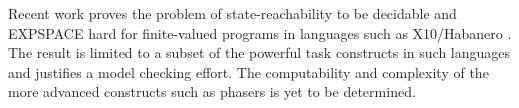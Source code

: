 \begin{comment}
Such a
dependence can be avoided, as in this work, by creating a
non-performance oriented runtime that is simple enough to manually
verify for correctness \cite{Morse:2012:MAM:2189257.2189279}. It is
much easier to access the state and direct behavior, as a model
checker, in such systems.
\end{comment}

Recent work proves the problem of state-reachability to be decidable
and EXPSPACE hard for finite-valued programs in languages such as
X10/Habanero \cite{Bouajjani:2012:ARP:2103621.2103681}. The result is
limited to a subset of the powerful task constructs in such languages
and justifies a model checking effort. The computability and
complexity of the more advanced constructs such as phasers is yet to
be determined.
